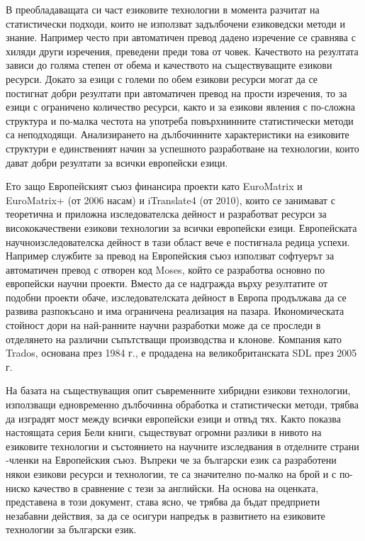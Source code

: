\documentclass[]{../../metanetpaper}
\begin{document}
\begin{multicols}{2}
В преобладаващата си част езиковите технологии в момента разчитат на статистически подходи, които не използват задълбочени езиковедски методи и знание. Например често при автоматичен превод дадено изречение се сравнява с хиляди други изречения, преведени преди това от човек. Качеството на резултата зависи до голяма степен от обема и качеството на съществуващите езикови ресурси. Докато за езици с големи по обем езикови ресурси могат да се постигнат добри резултати при автоматичен превод на прости изречения, то за езици с ограничено количество ресурси, както и за езикови явления с по-сложна структура и по-малка честота на употреба повърхнинните статистически методи са неподходящи. Анализирането на дълбочинните характеристики на езиковите структури е единственият начин за успешното разработване на технологии, които дават добри резултати за всички европейски езици.


Ето защо Европейският съюз финансира проекти като EuroMatrix и EuroMatrix+ (от 2006 насам) и iTranslate4 (от 2010), които се занимават с теоретична и приложна изследователска дейност и разработват ресурси за висококачествени езикови технологии за всички европейски езици. Европейската научноизследователска дейност в тази област вече е постигнала редица успехи. Например службите за превод на Европейския съюз използват софтуерът за автоматичен превод с отворен код Moses, който се разработва основно по европейски научни проекти. Вместо да се надгражда върху резултатите от подобни проекти обаче, изследователската дейност в Европа  продължава да се развива разпокъсано и има ограничена реализация на пазара. Икономическата стойност дори на най-ранните научни разработки може да се проследи в отделянето на различни съпътстващи производства и клонове. Компания като Trados, основана през 1984 г., е продадена на великобританската SDL през 2005 г.


На базата на съществуващия опит съвременните хибридни езикови технологии, използващи едновременно дълбочинна обработка и статистически методи, трябва да изградят мост между всички европейски езици и отвъд тях. Както показва настоящата серия Бели книги, съществуват огромни разлики в нивото на езиковите технологии и състоянието на научните изследвания в отделните страни -членки на Европейския съюз.
Въпреки че за български език са разработени някои езикови ресурси и технологии, те са значително по-малко на брой и с по-ниско качество в сравнение с тези за английски.
На основа на оценката, представена в този документ, става ясно, че трябва да бъдат предприети незабавни действия, за да се осигури напредък в развитието на езиковите технологии за български език.


\end{multicols}
\end{document}
